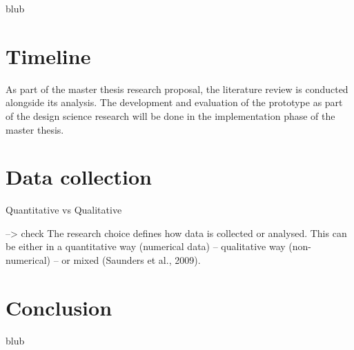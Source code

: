 blub



\section{Timeline}

As part of the master thesis research proposal, the literature review is conducted alongside its analysis. The development and evaluation of the prototype as part of the design science research will be done in the implementation phase of the master thesis.



\section{Data collection}

Quantitative vs Qualitative

--> check The research choice defines how data is collected or analysed. This can be either in a quantitative way (numerical data) – qualitative way (non-numerical) – or mixed (Saunders et al., 2009).





\section{Conclusion}

blub

